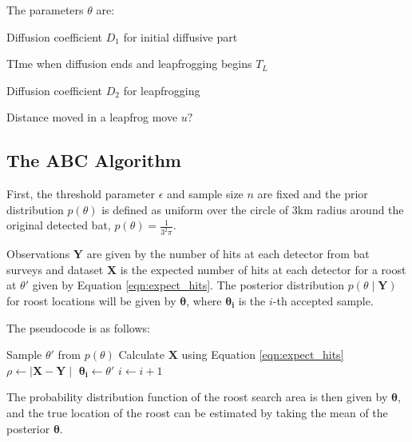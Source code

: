 The parameters $\theta$ are:

 Diffusion coefficient $D_1$ for initial diffusive part

TIme when diffusion ends and leapfrogging begins $T_L$

Diffusion coefficient $D_2$ for leapfrogging

Distance moved in a leapfrog move $u?$



\subsection{The ABC Algorithm}

First, the threshold parameter $\epsilon$ and sample size $n$ are fixed and the
prior distribution $p(\theta)$ is defined as uniform over the circle of 3km
radius around the original detected bat, $p(\theta) = \frac{1}{3^2 \pi}$.

Observations $\bm{Y}$ are given by the number of hits at each detector from bat
surveys and dataset $\bm{X}$ is the expected number of hits at each detector for
a roost at $\theta'$ given by Equation \ref{eqn:expect_hits}. The posterior
distribution $p(\theta \mid \bm{Y})$ for roost locations will be given by
$\bm{\theta}$, where $\bm{\theta_i}$ is the $i$-th accepted sample.

The pseudocode is as follows:

\begin{algorithmic}
    \State  Sample $\theta'$ from $p(\theta)$
    \State Calculate $\bm{X}$ using Equation \ref{eqn:expect_hits}
    \State $\rho \gets \mid \bm{X} - \bm{Y} \mid$
    \If {$\bar{\rho} < \epsilon$}
      \State $\bm{\theta_i} \gets \theta'$
    	\State $i \gets i + 1$
    \EndIf
  \EndWhile
\end{algorithmic}

The probability distribution function of the roost search area is then given by $\bm{\theta}$, and the true location of the
roost can be estimated by taking the mean of the posterior $\bm{\theta}$.
